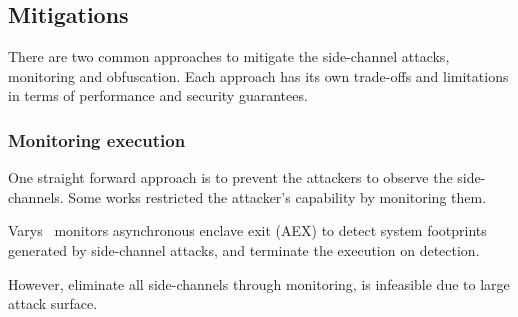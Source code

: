 \iffalse
\subsection{Mitigations}
\label{sec:background:mitigations}
There are two common approaches to mitigate the side-channel attacks, monitoring and obfuscation.
Each approach has its own trade-offs and limitations in terms of performance and security guarantees.

\subsubsection{Monitoring execution}
One straight forward approach is to prevent the attackers to observe the side-channels.
Some works restricted the attacker's capability by monitoring them.

Varys~\cite{oleksenko2018varys} monitors asynchronous enclave exit (AEX) to detect system footprints generated by side-channel attacks, and terminate the execution on detection.

However, eliminate all side-channels through monitoring, is infeasible due to large attack surface.

